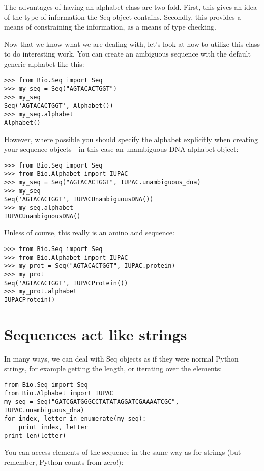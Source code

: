 \documentclass{report}
\begin{document}
The advantages of having an alphabet class are two fold. First, this gives an idea of the type of information the Seq object contains. Secondly, this provides a means of constraining the information, as a means of type checking.

Now that we know what we are dealing with, let's look at how to utilize this class to do interesting work.
You can create an ambiguous sequence with the default generic alphabet like this:

\begin{verbatim}
>>> from Bio.Seq import Seq
>>> my_seq = Seq("AGTACACTGGT")
>>> my_seq
Seq('AGTACACTGGT', Alphabet())
>>> my_seq.alphabet
Alphabet()
\end{verbatim}

However, where possible you should specify the alphabet explicitly when creating your sequence objects - in this case an unambiguous DNA alphabet object:

\begin{verbatim}
>>> from Bio.Seq import Seq
>>> from Bio.Alphabet import IUPAC
>>> my_seq = Seq("AGTACACTGGT", IUPAC.unambiguous_dna)
>>> my_seq
Seq('AGTACACTGGT', IUPACUnambiguousDNA())
>>> my_seq.alphabet
IUPACUnambiguousDNA()
\end{verbatim}

Unless of course, this really is an amino acid sequence:

\begin{verbatim}
>>> from Bio.Seq import Seq
>>> from Bio.Alphabet import IUPAC
>>> my_prot = Seq("AGTACACTGGT", IUPAC.protein)
>>> my_prot
Seq('AGTACACTGGT', IUPACProtein())
>>> my_prot.alphabet
IUPACProtein()
\end{verbatim}

\section{Sequences act like strings}

In many ways, we can deal with Seq objects as if they were normal Python strings, for example getting the length, or iterating over the elements:

\begin{verbatim}
from Bio.Seq import Seq
from Bio.Alphabet import IUPAC
my_seq = Seq("GATCGATGGGCCTATATAGGATCGAAAATCGC", IUPAC.unambiguous_dna)
for index, letter in enumerate(my_seq):
    print index, letter
print len(letter)
\end{verbatim}

You can access elements of the sequence in the same way as for strings (but remember, Python counts from zero!):
\end{document}
